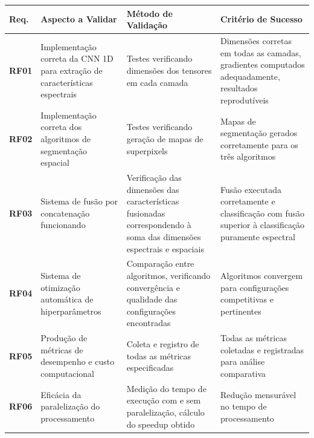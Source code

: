 \begin{quadro}[H]
    \centering
    \caption{Plano de verificação dos requisitos funcionais}
    \begin{tabular}{|p{}|p{}|p{}|p{}|}
        \hline
        \rowcolor[HTML]{C0C0C0}
        \textbf{Req.} & \textbf{Aspecto a Validar} & \textbf{Método de Validação} & \textbf{Critério de Sucesso} \\
        \hline
        
        \textbf{RF01} & Implementação correta da CNN 1D para extração de características espectrais & Testes verificando dimensões dos tensores em cada camada & Dimensões corretas em todas as camadas, gradientes computados adequadamente, resultados reprodutíveis \\
        \hline
        
        \textbf{RF02} & Implementação correta dos algoritmos de segmentação espacial & Testes verificando geração de mapas de superpixels & Mapas de segmentação gerados corretamente para os três algoritmos \\
        \hline
        
        \textbf{RF03} & Sistema de fusão por concatenação funcionando & Verificação das dimensões das características fusionadas correspondendo à soma das dimensões espectrais e espaciais & Fusão executada corretamente e classificação com fusão superior à classificação puramente espectral \\
        \hline
        
        \textbf{RF04} & Sistema de otimização automática de hiperparâmetros & Comparação entre algoritmos, verificando convergência e qualidade das configurações encontradas & Algoritmos convergem para configurações competitivas e pertinentes \\
        \hline
        
        \textbf{RF05} & Produção de métricas de desempenho e custo computacional & Coleta e registro de todas as métricas especificadas & Todas as métricas coletadas e registradas para análise comparativa \\
        \hline
        
        \textbf{RF06} & Eficácia da paralelização do processamento & Medição do tempo de execução com e sem paralelização, cálculo do speedup obtido & Redução mensurável no tempo de processamento \\
        \hline
    \end{tabular}
    \label{tab:planoVerificacaoRF}
\end{quadro}

